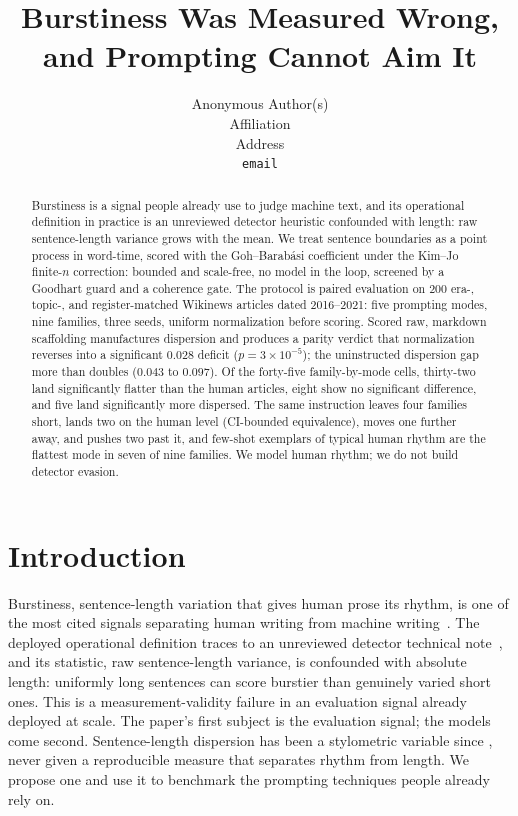 \documentclass{article}
\title{Burstiness Was Measured Wrong, and Prompting Cannot Aim It}
\author{Anonymous Author(s)\\
  Affiliation\\
  Address\\
  \texttt{email}}
\begin{document}
\maketitle

\begin{abstract}
\noindent
Burstiness is a signal people already use to judge machine text, and its
operational definition in practice is an unreviewed detector heuristic
confounded with length: raw sentence-length variance grows with the mean.
We treat sentence boundaries as a point process in word-time, scored with
the Goh--Barab\'asi coefficient under the Kim--Jo finite-$n$ correction:
bounded and scale-free, no model in the loop, screened by a Goodhart guard
and a coherence gate. The protocol is paired evaluation on $200$ era-,
topic-, and register-matched Wikinews articles dated 2016--2021: five prompting
modes, nine families, three seeds, uniform normalization before scoring. Scored raw, markdown scaffolding
manufactures dispersion and produces a parity verdict that normalization
reverses into a significant $0.028$ deficit ($p=3\times10^{-5}$); the
uninstructed dispersion gap more than doubles ($0.043$ to $0.097$). Of the forty-five family-by-mode
cells, thirty-two land significantly flatter than the human articles,
eight show no significant difference, and five land significantly more
dispersed. The same instruction leaves four families short, lands two on
the human level (CI-bounded equivalence), moves one further away, and
pushes two past it, and few-shot exemplars of typical human rhythm are
the flattest mode in seven of nine families.
We model human rhythm; we do not build detector evasion.
\end{abstract}

\section{Introduction}

Burstiness, sentence-length variation that gives human prose its rhythm,
is one of the most cited signals separating human writing from machine
writing~\citep{arxiv2024detecting, arxiv2025detecting}. The deployed
operational definition traces to an unreviewed detector technical
note~\citep{arxiv2024detecting, arxiv2025training}, and its statistic,
raw sentence-length variance, is confounded with absolute length:
uniformly long sentences can score burstier than genuinely varied short
ones. This is a measurement-validity failure in an evaluation signal
already deployed at scale. The paper's first subject is the evaluation
signal; the models come second. Sentence-length dispersion has been a
stylometric variable since \citet{yule1939sentence, williams1940note},
never given a reproducible measure that separates rhythm from length.
We propose one and use it to benchmark the prompting techniques people
already rely on.
\end{document}
